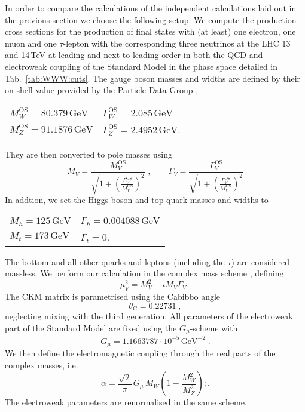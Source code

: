 In order to compare the calculations of the independent 
calculations laid out in the previous section we 
choose the following setup.
We compute the production cross sections for the production of 
final states with (at least) one electron, one muon and one 
$\tau$-lepton with the corresponding three neutrinos at the 
LHC 13 and 14\,TeV at leading and next-to-leading order 
in both the QCD and electroweak coupling of the Standard Model
in the phase space detailed in 
Tab.\ \ref{tab:WWW:cuts}. 
The gauge boson masses and widths are defined by their on-shell 
value provided by the Particle Data Group \cite{}, 
\begin{center}
  \begin{tabular}{ll}
    $M_W^\text{OS}=80.379\,\text{GeV}$\qquad & $\Gamma_W^\text{OS}=2.085\,\text{GeV}$ \\
    $M_Z^\text{OS}=91.1876\,\text{GeV}$\qquad & $\Gamma_Z^\text{OS}=2.4952\,\text{GeV}$.
  \end{tabular}
\end{center}
They are then converted to pole masses using 
\begin{equation}
  M_V=\frac{M_V^\text{OS}}{\sqrt{1+\left(\frac{\Gamma_V^\text{OS}}{M_V^\text{OS}}\right)^2}}\;,
  \qquad
  \Gamma_V=\frac{\Gamma_V^\text{OS}}{\sqrt{1+\left(\frac{\Gamma_V^\text{OS}}{M_V^\text{OS}}\right)^2}}
\end{equation}
In addtion, we set the Higgs boson and top-quark masses 
and widths to 
\begin{center}
  \begin{tabular}{ll}
    $M_h=125\,\text{GeV}$ & $\Gamma_h=0.004088\,\text{GeV}$ \\
    $M_t=173\,\text{GeV}$ & $\Gamma_t=0$\;. \\
  \end{tabular}
\end{center}
The bottom and all other quarks and leptons (including the $\tau$) 
are considered massless.
We perform our calculation in the complex mass scheme 
\cite{Denner:2005fg,Denner:2014zga},
defining
\begin{equation}
  \mu_V^2=M_V^2-iM_V\Gamma_V\;.
\end{equation}
The CKM matrix is parametrised using the Cabibbo angle 
\begin{equation}
  \theta_\text{C}=0.22731\;,\nonumber
\end{equation}
neglecting mixing with the third generation. 
All parameters of the electroweak part of the Standard Model 
are fixed using the $G_\mu$-scheme \cite{} with
\begin{equation}
  G_\mu=1.1663787\cdot 10^{-5}\,\text{GeV}^{-2}\;.\nonumber
\end{equation}
We then define the electromagnetic coupling through the 
real parts of the complex masses, i.e.\
\begin{equation}
  \alpha=\frac{\sqrt{2}}{\pi}\,G_\mu\,M_W\left(1-\frac{M_W^2}{M_Z^2}\right);.
\end{equation}
The electroweak parameters are renormalised in the same scheme.

